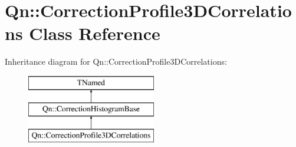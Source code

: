 \hypertarget{classQn_1_1CorrectionProfile3DCorrelations}{}\section{Qn\+:\+:Correction\+Profile3\+D\+Correlations Class Reference}
\label{classQn_1_1CorrectionProfile3DCorrelations}
Inheritance diagram for Qn\+:\+:Correction\+Profile3\+D\+Correlations\+:\begin{figure}[H]
\begin{center}
\leavevmode
\includegraphics[height=3.000000cm]{classQn_1_1CorrectionProfile3DCorrelations}
\end{center}
\end{figure}
